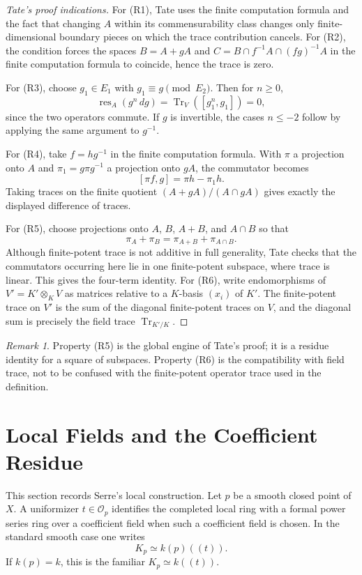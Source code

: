 \documentclass[11pt,a4paper]{article}
\newcommand{\OO}{\mathcal O}
\newcommand{\res}{\operatorname{res}}
\newcommand{\Tr}{\operatorname{Tr}}
\theoremstyle{definition}
\theoremstyle{plain}
\theoremstyle{remark}
\newtheorem*{remark}{Remark}
\begin{document}
\begin{proof}[Tate's proof indications]
For (R1), Tate uses the finite computation formula and the fact that changing $A$ within its commensurability class changes only finite-dimensional boundary pieces on which the trace contribution cancels.  For (R2), the condition forces the spaces $B=A+gA$ and $C=B\cap f^{-1}A\cap(fg)^{-1}A$ in the finite computation formula to coincide, hence the trace is zero.

For (R3), choose $g_1\in E_1$ with $g_1\equiv g\pmod {E_2}$.  Then for $n\ge0$,
\[
  \res_A(g^n\,dg)=\Tr_V([g_1^n,g_1])=0,
\]
since the two operators commute.  If $g$ is invertible, the cases $n\le -2$ follow by applying the same argument to $g^{-1}$.

For (R4), take $f=hg^{-1}$ in the finite computation formula.  With $\pi$ a projection onto $A$ and $\pi_1=g\pi g^{-1}$ a projection onto $gA$, the commutator becomes
\[
  [\pi f,g]=\pi h-\pi_1 h.
\]
Taking traces on the finite quotient $(A+gA)/(A\cap gA)$ gives exactly the displayed difference of traces.

For (R5), choose projections onto $A$, $B$, $A+B$, and $A\cap B$ so that
\[
  \pi_A+\pi_B=\pi_{A+B}+\pi_{A\cap B}.
\]
Although finite-potent trace is not additive in full generality, Tate checks that the commutators occurring here lie in one finite-potent subspace, where trace is linear.  This gives the four-term identity.  For (R6), write endomorphisms of $V'=K'\otimes_KV$ as matrices relative to a $K$-basis $(x_i)$ of $K'$.  The finite-potent trace on $V'$ is the sum of the diagonal finite-potent traces on $V$, and the diagonal sum is precisely the field trace $\Tr_{K'/K}$.
\end{proof}

\begin{remark}
Property (R5) is the global engine of Tate's proof; it is a residue identity for a square of subspaces.  Property (R6) is the compatibility with field trace, not to be confused with the finite-potent operator trace used in the definition.
\end{remark}

\section{Local Fields and the Coefficient Residue}

This section records Serre's local construction.  Let $p$ be a smooth closed point of $X$.  A uniformizer $t\in\OO_p$ identifies the completed local ring with a formal power series ring over a coefficient field when such a coefficient field is chosen.  In the standard smooth case one writes
\[
  K_p\simeq k(p)((t)).
\]
If $k(p)=k$, this is the familiar $K_p\simeq k((t))$.
\end{document}
